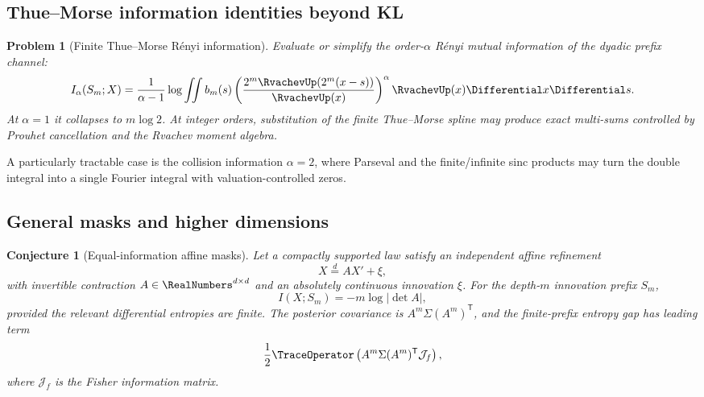 \documentclass[11pt,oneside]{article}
\newtheorem{conjecture}[theorem]{Conjecture}
\newtheorem{problem}[theorem]{Problem}
\theoremstyle{definition}
\theoremstyle{remark}
\begin{document}
\subsection{Thue--Morse information identities beyond KL}

\begin{problem}[Finite Thue--Morse R\'enyi information]
\label{prob:TM-Renyi}
Evaluate or simplify the order-$\alpha$ R\'enyi mutual information of the dyadic
prefix channel:
\begin{equation}
 I_\alpha(S_m;X)
 =\frac1{\alpha-1}
 \log\iint b_m(s)
 \left(\frac{2^m\RvachevUp(2^m(x-s))}{\RvachevUp(x)}\right)^{\alpha}
 \RvachevUp(x)\Differential x\Differential s.
 \label{eq:TM-Renyi}
\end{equation}
At $\alpha=1$ it collapses to $m\log2$.  At integer orders, substitution of the
finite Thue--Morse spline may produce exact multi-sums controlled by Prouhet
cancellation and the Rvachev moment algebra.
\end{problem}

A particularly tractable case is the collision information $\alpha=2$, where
Parseval and the finite/infinite sinc products may turn the double integral into a
single Fourier integral with valuation-controlled zeros.

\subsection{General masks and higher dimensions}

\begin{conjecture}[Equal-information affine masks]
\label{conj:general-mask}
Let a compactly supported law satisfy an independent affine refinement
\begin{equation}
 X\stackrel d=A X'+\xi,
 \label{eq:matrix-refinement}
\end{equation}
with invertible contraction $A\in\RealNumbers^{d\times d}$ and an absolutely continuous
innovation $\xi$.  For the depth-$m$ innovation prefix $S_m$,
\begin{equation}
 I(X;S_m)=-m\log|\det A|,
 \label{eq:matrix-information}
\end{equation}
provided the relevant differential entropies are finite.  The posterior covariance
is $A^m\Sigma(A^m)^{\mathsf T}$, and the finite-prefix entropy gap has leading term
\begin{equation}
 \frac12\TraceOperator
 \left(A^m\Sigma(A^m)^{\mathsf T}\mathcal J_f\right),
 \label{eq:matrix-fisher-gap}
\end{equation}
where $\mathcal J_f$ is the Fisher information matrix.
\end{conjecture}
\end{document}
